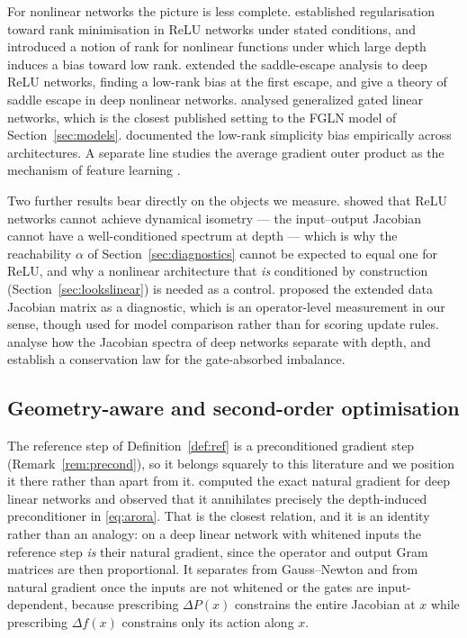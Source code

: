 \documentclass{article} %
\theoremstyle{plain}
\theoremstyle{definition}
\theoremstyle{remark}
\begin{document}
For nonlinear networks the picture is less complete. \citet{timor2023implicit} established
regularisation toward rank minimisation in ReLU networks under stated conditions, and
\citet{jacot2023implicit} introduced a notion of rank for nonlinear functions under which large
depth induces a bias toward low rank. \citet{bantzis2025saddle} extended the saddle-escape analysis
to deep ReLU networks, finding a low-rank bias at the first escape, and \citet{rawal2026saddle} give
a theory of saddle escape in deep nonlinear networks. \citet{gatedlinear2022implicit} analysed
generalized gated linear networks, which is the closest published setting to the FGLN model of
Section~\ref{sec:models}. \citet{huh2021lowrank} documented the low-rank simplicity bias
empirically across architectures. A separate line studies the average gradient outer product as the
mechanism of feature learning \citep{radhakrishnan2024mechanism,beaglehole2024agop}.

Two further results bear directly on the objects we measure. \citet{pennington2017resurrecting}
showed that ReLU networks cannot achieve dynamical isometry --- the input--output Jacobian cannot
have a well-conditioned spectrum at depth --- which is why the reachability $\alpha$ of
Section~\ref{sec:diagnostics} cannot be expected to equal one for ReLU, and why a nonlinear
architecture that \emph{is} conditioned by construction (Section~\ref{sec:lookslinear}) is needed as
a control. \citet{wang2016extended} proposed the extended data Jacobian matrix as a diagnostic,
which is an operator-level measurement in our sense, though used for model comparison rather than
for scoring update rules. \citet{haas2026why} analyse how the Jacobian spectra of deep networks
separate with depth, and establish a conservation law for the gate-absorbed imbalance.

\subsection{Geometry-aware and second-order optimisation}

The reference step of Definition~\ref{def:ref} is a preconditioned gradient step
(Remark~\ref{rem:precond}), so it belongs squarely to this literature and we position it there
rather than apart from it. \citet{bernacchia2018exact} computed the exact natural gradient for deep
linear networks and observed that it annihilates precisely the depth-induced preconditioner in
\eqref{eq:arora}. That is the closest relation, and it is an identity rather than an analogy: on a
deep linear network with whitened inputs the reference step \emph{is} their natural gradient, since
the operator and output Gram matrices are then proportional. It separates from Gauss--Newton and
from natural gradient once the inputs are not whitened or the gates are input-dependent, because
prescribing $\Delta P(x)$ constrains the entire Jacobian at $x$ while prescribing $\Delta f(x)$
constrains only its action along $x$.
\end{document}
